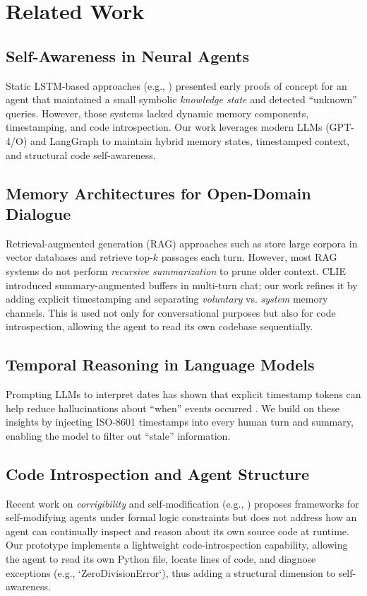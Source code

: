 \documentclass[11pt]{article}
\begin{document}
\section{Related Work}

\subsection{Self-Awareness in Neural Agents}
Static LSTM-based approaches (e.g., \cite{Mukai2020}) presented early proofs of concept for an agent that maintained a small symbolic \emph{knowledge state} and detected “unknown” queries. However, those systems lacked dynamic memory components, timestamping, and code introspection. Our work leverages modern LLMs (GPT-4/O) \cite{ChenGupta2024} and LangGraph to maintain hybrid memory states, timestamped context, and structural code self-awareness.

\subsection{Memory Architectures for Open-Domain Dialogue}
Retrieval-augmented generation (RAG) approaches such as \cite{Lewis2020} store large corpora in vector databases and retrieve top-$k$ passages each turn. However, most RAG systems do not perform \emph{recursive summarization} to prune older context. CLIE \cite{Sanh2022} introduced summary-augmented buffers in multi-turn chat; our work refines it by adding explicit timestamping and separating \emph{voluntary} vs. \emph{system} memory channels.  This is used not only for conversational purposes but also for code introspection, allowing the agent to read its own codebase sequentially.

\subsection{Temporal Reasoning in Language Models}
Prompting LLMs to interpret dates has shown that explicit timestamp tokens can help reduce hallucinations about “when” events occurred \cite{Zhang2023}. We build on these insights by injecting ISO-8601 timestamps into every human turn and summary, enabling the model to filter out “stale” information.

\subsection{Code Introspection and Agent Structure}
Recent work on \emph{corrigibility} and self-modification (e.g., \cite{Soares2015}) proposes frameworks for self-modifying agents under formal logic constraints but does not address how an agent can continually inspect and reason about its own source code at runtime. Our prototype implements a lightweight code-introspection capability, allowing the agent to read its own Python file, locate lines of code, and diagnose exceptions (e.g., `ZeroDivisionError`), thus adding a structural dimension to self-awareness.
\end{document}
